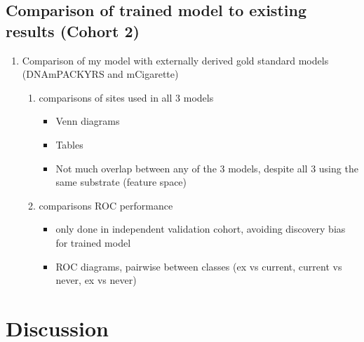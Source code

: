 \documentclass{article}
\begin{document}
\subsection{Comparison of trained model to existing results (Cohort 2)} \label{sec:model-comparisons}
\begin{enumerate}
    \item Comparison of my model with externally derived gold standard models (DNAmPACKYRS and mCigarette)
          \begin{enumerate}
              \item comparisons of sites used in all 3 models
                    \begin{itemize}
                        \item Venn diagrams
                        \item Tables
                        \item Not much overlap between any of the 3 models, despite all 3 using the same substrate (feature space)
                    \end{itemize}
              \item comparisons ROC performance
                    \begin{itemize}
                        \item only done in independent validation cohort, avoiding discovery bias for trained model
                        \item ROC diagrams, pairwise between classes (ex vs current, current vs never, ex vs never)
                    \end{itemize}
          \end{enumerate}
\end{enumerate}

\section{Discussion}
\end{document}

